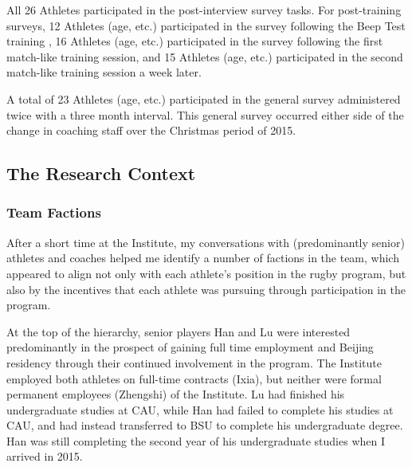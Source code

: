 \begin{CJK}{UTF8}{gbsn}
    All 26 Athletes participated in the post-interview survey tasks.  For post-training surveys, 12 Athletes (age, etc.) participated in the survey following the Beep Test training , 16 Athletes (age, etc.) participated in the survey following the first match-like training session, and 15 Athletes (age, etc.) participated in the second match-like training session a week later.

    A total of 23 Athletes (age, etc.) participated in the general survey administered twice with a three month interval. This general survey occurred either side of the change in coaching staff over the Christmas period of 2015.




  \subsection{The Research Context}


  \subsubsection{Team Factions}

  After a short time at the Institute, my conversations with (predominantly senior) athletes and coaches helped me identify a number of factions in the team, which appeared to align not only with each athlete's position in the rugby program, but also by the incentives that each athlete was pursuing through participation in the program.

  At the top of the hierarchy, senior players Han and Lu were interested predominantly in the prospect of gaining full time employment and Beijing residency through their continued involvement in the program. The Institute employed both athletes on full-time contracts (Ixia), but neither were formal permanent employees (Zhengshi) of the Institute.  Lu had finished his undergraduate studies at CAU, while Han had failed to complete his studies at CAU, and had instead transferred to BSU to complete his undergraduate degree. Han was still completing the second year of his undergraduate studies when I arrived in 2015.


\end{CJK}
